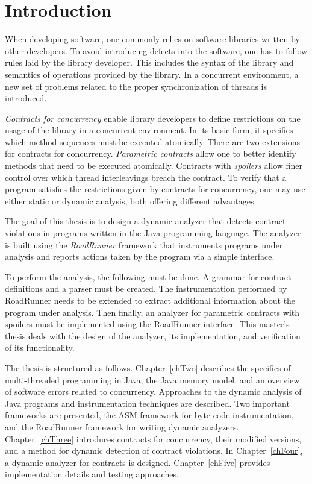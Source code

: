 
\chapter{Introduction}

When developing software, one commonly relies on software libraries written by
other developers. To avoid introducing defects into the software, one has to
follow rules laid by the library developer. This includes the syntax of the
library and semantics of operations provided by the library. In a concurrent
environment, a new set of problems related to the proper synchronization of
threads is introduced.

\emph{Contracts for concurrency} enable library developers to define
restrictions on the usage of the library in a concurrent environment. In its
basic form, it specifies which method sequences must be executed atomically.
There are two extensions for contracts for concurrency. \emph{Parametric
contracts} allow one to better identify methods that need to be executed
atomically.  Contracts with \emph{spoilers} allow finer control over which
thread interleavings breach the contract. To verify that a program satisfies the
restrictions given by contracts for concurrency, one may use either static or
dynamic analysis, both offering different advantages.

The goal of this thesis is to design a dynamic analyzer that detects contract
violations in programs written in the Java programming language. The analyzer
is built using the \emph{RoadRunner} framework that instruments programs under
analysis and reports actions taken by the program via a simple interface.

To perform the analysis, the following must be done. A grammar for contract
definitions and a parser must be created. The instrumentation performed by
RoadRunner needs to be extended to extract additional information about the
program under analysis. Then finally, an analyzer for parametric contracts with
spoilers must be implemented using the RoadRunner interface. This master's
thesis deals with the design of the analyzer, its implementation, and
verification of its functionality.

The thesis is structured as follows. Chapter~\ref{chTwo} describes the specifics
of multi-threaded programming in Java, the Java memory model, and an overview of
software errors related to concurrency. Approaches to the dynamic analysis of
Java programs and instrumentation techniques are described. Two important
frameworks are presented, the ASM framework for byte code instrumentation, and
the RoadRunner framework for writing dynamic analyzers. Chapter~\ref{chThree}
introduces contracts for concurrency, their modified versions, and a method for
dynamic detection of contract violations. In Chapter~\ref{chFour}, a dynamic
analyzer for contracts is designed. Chapter~\ref{chFive} provides implementation
details and testing approaches.



